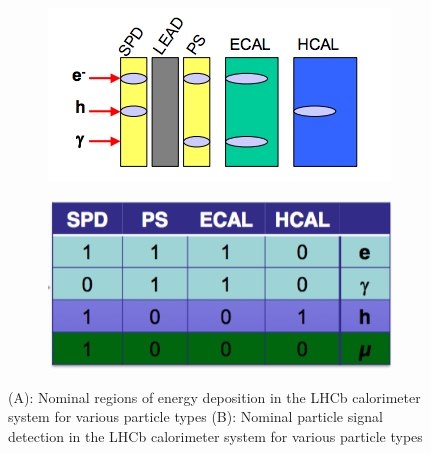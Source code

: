 \begin{figure}[h]
        \centering
        \begin{subfigure}[b]{0.5\textwidth}
                \centering
                \includegraphics[width=\textwidth]{./Chapters/detector/calorimeter/deposition_region.png}
                \label{fig: calo_nominal_detection_regions1}
                \caption{}
        \end{subfigure}
        \begin{subfigure}[b]{0.4\textwidth}
                \centering
                \includegraphics[width=\textwidth]{./Chapters/detector/calorimeter/deposition_region_table.png}
                \label{fig: calo_nominal_detection_regions2}
                \caption{}
        \end{subfigure}
        \caption{(A): Nominal regions of energy deposition in the LHCb calorimeter system for various particle types (B): Nominal particle signal detection in the LHCb calorimeter system for various particle types}
        \label{fig:animals}
\end{figure}

